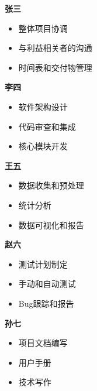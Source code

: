 \documentclass[
    linespread = 1.25
]{ctexart}
\begin{document}
\textbf{张三}
\begin{itemize}
  \item 整体项目协调
  \item 与利益相关者的沟通
  \item 时间表和交付物管理
\end{itemize}

\textbf{李四}
\begin{itemize}
  \item 软件架构设计
  \item 代码审查和集成
  \item 核心模块开发
\end{itemize}

\textbf{王五}
\begin{itemize}
  \item 数据收集和预处理
  \item 统计分析
  \item 数据可视化和报告
\end{itemize}

\textbf{赵六}
\begin{itemize}
  \item 测试计划制定
  \item 手动和自动测试
  \item Bug跟踪和报告
\end{itemize}

\textbf{孙七}
\begin{itemize}
  \item 项目文档编写
  \item 用户手册
  \item 技术写作
\end{itemize}


\end{document}
